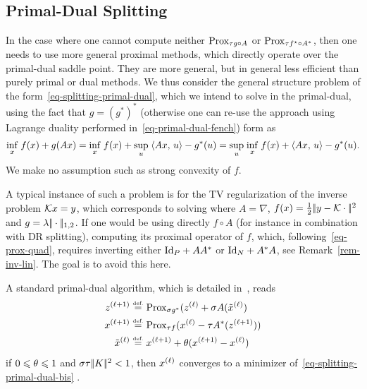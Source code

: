 \subsection{Primal-Dual Splitting}

In the case where one cannot compute neither $\Prox_{\tau g \circ A}$ or $\Prox_{\tau f^\star\circ A^*}$, then one needs to use more general proximal methods, which directly operate over the primal-dual saddle point. They are more general, but in general less efficient than purely primal or dual methods. 
%
We thus consider the general structure problem of the form~\eqref{eq-splitting-primal-dual}, which we intend to solve in the primal-dual, using the fact that $g = (g^*)^*$ (otherwise one can re-use the approach using Lagrange duality performed in~\eqref{eq-primal-dual-fench}) form as
\begin{align}\label{eq-splitting-primal-dual-bis}
	\uinf{x} f(x) + g(Ax) = \uinf{x} f(x) + \usup{u} \dotp{Ax}{u} - g^*(u)
	= \usup{u} \uinf{x} f(x) + \dotp{Ax}{u}  - g^*(u).
\end{align}
We make no assumption such as strong convexity of $f$. 

\begin{exmp}
A typical instance of such a problem is for the TV regularization of the inverse problem $\Kk x=y$, which corresponds to solving
where $A=\nabla$, $f(x)=\frac{1}{2}\norm{y-\Kk \cdot}^2$ and $g=\la \norm{\cdot}_{1,2}$.
%
If one would be using directly $f \circ A$ (for instance in combination with DR splitting), computing its proximal operator of $f$, which, following~\eqref{eq-prox-quad}, requires inverting either $\Id_P+AA^*$ or $\Id_N+A^*A$, see Remark~\ref{rem-inv-lin}. The goal is to avoid this here. 
\end{exmp}

A standard primal-dual algorithm, which is detailed in~\cite{}, reads
\begin{align*}
	\iit{z} &\eqdef \Prox_{\sigma g^*}( \it{z} + \sigma A( \it{\tilde x}) \\
	\iit{x} &\eqdef \Prox_{\tau f}(  \it{x}-\tau A^*(\iit{z}) ) \\
	 \it{\tilde x} &\eqdef \iit{x} + \theta (\iit{x} - \it{x}) 
\end{align*}
if $0 \leq \th \leq 1$ and $\sigma \tau \norm{K}^2<1$, then $\it{x}$ converges to a minimizer of~\eqref{eq-splitting-primal-dual-bis} .
